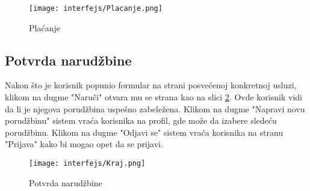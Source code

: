 \documentclass[a4paper]{article}
\begin{document}
\begin{figure}[H]
    \centering
    \texttt{[image: interfejs/Placanje.png]}
    \caption{Plaćanje}
    \label{fig:ki_placanje}
\end{figure}

\subsection{Potvrda narudžbine}

Nakon što je korisnik popunio formular na strani posvećenoj konkretnoj usluzi, klikom na dugme "Naruči" otvara mu se strana kao na slici \ref{fig:ki_kraj}. Ovde korisnik vidi da li je njegova porudžbina uspešno zabeležena. Klikom na dugme "Napravi novu porudžbinu" sistem vraća korisnika na profil, gde može da izabere sledeću porudžbinu. Klikom na dugme "Odjavi se" sistem vraća korisnika na stranu "Prijava" kako bi mogao opet da se prijavi.

\begin{figure}[H]
    \centering
    \texttt{[image: interfejs/Kraj.png]}
    \caption{Potvrda narudžbine}
    \label{fig:ki_kraj}
\end{figure}
\end{document}
